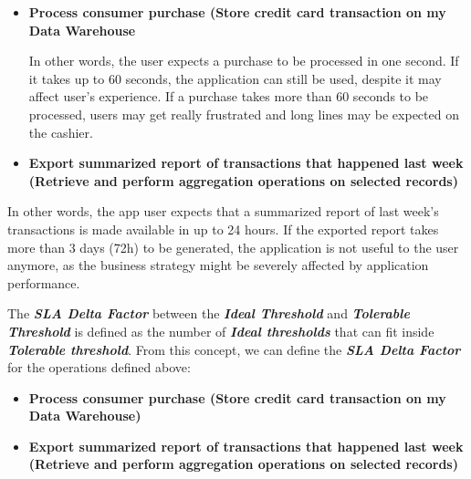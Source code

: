\begin{itemize}
\item{ 
\textbf{Process consumer purchase (Store credit card transaction on my Data Warehouse}
}

In other words, the user expects a purchase to be processed in one second. If it takes up to 60 seconds, the application can still be used, despite it may affect user's experience. If a purchase takes more than 60 seconds to be processed, users may get really frustrated and long lines may be expected on the cashier.

\item{
\textbf{Export summarized report of transactions that happened last week (Retrieve and perform aggregation operations on selected records) }
}
\end{itemize}
     
In other words, the app user expects that a summarized report of last week's transactions is made available in up to 24 hours. If the exported report takes more than 3 days (72h) to be generated, the application is not useful to the user anymore, as the business strategy might be severely affected by application performance.

The \textbf{\textit{SLA Delta Factor}} between the \textbf{\textit{Ideal Threshold}} and \textbf{\textit{Tolerable Threshold}} is defined as the number of \textbf{\textit{Ideal thresholds}} that can fit inside \textbf{\textit{Tolerable threshold}}. From this concept, we can define the \textbf{\textit{SLA Delta Factor}} for the operations defined above:

\begin{itemize}
\item{ 
\textbf{Process consumer purchase (Store credit card transaction on my Data Warehouse)}
}

\item{
\textbf{Export summarized report of transactions that happened last week (Retrieve and perform aggregation operations on selected records) }
}

\end{itemize}

